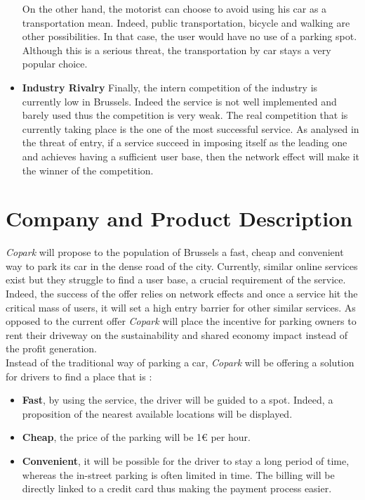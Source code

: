 \documentclass[12pt,a4paper,oneside]{book}
\newcommand{\bp}{\textit{Copark}}
\begin{document}
\begin{itemize}
On the other hand, the motorist can choose to avoid using his car as a transportation mean. Indeed, public transportation, bicycle and walking are other possibilities. In that case, the user would have no use of a parking spot. Although this is a serious threat, the transportation by car stays a very popular choice.
\item \textbf{Industry Rivalry} Finally, the intern competition of the industry is currently low in Brussels. Indeed the service is not well implemented and barely used thus the competition is very weak. The real competition that is currently taking place is the one of the most successful service. As analysed in the threat of entry, if a service succeed in imposing itself as the leading one and achieves  having a sufficient user base, then the network effect will make it the winner of the competition.
\end{itemize}

\chapter{Company and Product Description}
\label{cpdch}

\bp{} will propose to the population of Brussels a fast, cheap and convenient way to park its car in the dense road of the city. Currently, similar online services exist but they struggle to find a user base, a crucial requirement of the service. Indeed, the success of the offer relies on network effects and once a service hit the critical mass of users, it will set a high entry barrier for other similar services. As opposed to the current offer \bp{} will place the incentive for parking owners to rent their driveway on the sustainability and shared economy impact instead of the profit generation.\\

Instead of the traditional way of parking a car, \bp{} will be offering a solution for drivers to find a place that is :
\begin{itemize}
\item \textbf{Fast}, by using the service, the driver will be guided to a spot. Indeed, a proposition of the nearest available locations will be displayed.
\item \textbf{Cheap}, the price of the parking will be 1\euro{} per hour.
\item \textbf{Convenient}, it will be possible for the driver to stay a long period of time, whereas the in-street parking is often limited in time. The billing will be directly linked to a credit card thus making the payment process easier.
\end{itemize} 
\end{document}
